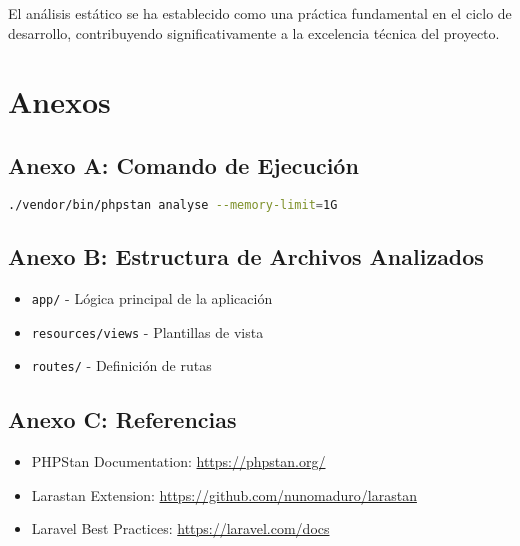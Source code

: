 \documentclass[12pt,a4paper]{article}
\begin{document}
El análisis estático se ha establecido como una práctica fundamental en el ciclo de desarrollo, contribuyendo significativamente a la excelencia técnica del proyecto.

\newpage

\section{Anexos}

\subsection{Anexo A: Comando de Ejecución}

\begin{lstlisting}[language=bash, caption=Comando PHPStan utilizado]
./vendor/bin/phpstan analyse --memory-limit=1G
\end{lstlisting}

\subsection{Anexo B: Estructura de Archivos Analizados}

\begin{itemize}
    \item \texttt{app/} - Lógica principal de la aplicación
    \item \texttt{resources/views} - Plantillas de vista
    \item \texttt{routes/} - Definición de rutas
\end{itemize}

\subsection{Anexo C: Referencias}

\begin{itemize}
    \item PHPStan Documentation: \url{https://phpstan.org/}
    \item Larastan Extension: \url{https://github.com/nunomaduro/larastan}
    \item Laravel Best Practices: \url{https://laravel.com/docs}
\end{itemize}
\end{document}
